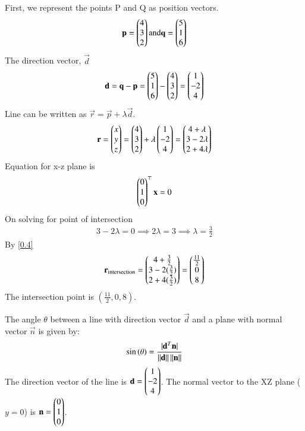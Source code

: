 \documentclass[journal]{IEEEtran}
\begin{document}
	First, we represent the points P and Q as position vectors.
	\begin{align}
		\mathbf{p} = \begin{pmatrix}4 \\ 3 \\ 2\end{pmatrix}  \text{and}  \mathbf{q} = \begin{pmatrix}5 \\ 1 \\ 6\end{pmatrix}
	\end{align}
	The direction vector, $\vec{d}$
	\begin{align}
		\mathbf{d} = \mathbf{q} - \mathbf{p} = \begin{pmatrix}5 \\ 1 \\ 6\end{pmatrix} - \begin{pmatrix}4 \\ 3 \\ 2\end{pmatrix} = \begin{pmatrix}1 \\ -2 \\ 4\end{pmatrix}
	\end{align}
	Line can be written as $\vec{r} = \vec{p} + \lambda \vec{d}$.
	\begin{align}
		\mathbf{r} = \begin{pmatrix}x \\ y \\ z\end{pmatrix} = \begin{pmatrix}4 \\ 3 \\ 2\end{pmatrix} + \lambda \begin{pmatrix}1 \\ -2 \\ 4\end{pmatrix} = \begin{pmatrix}4 + \lambda \\ 3 - 2\lambda \\ 2 + 4\lambda\end{pmatrix}
	\end{align}
	Equation for x-z plane is
	\begin{align}
		\begin{myvec}{0\\1\\0}\end{myvec}^\top\vec{x}=0
	\end{align}
	On solving for point of intersection
	\begin{align}
		3 - 2\lambda = 0 \implies 2\lambda = 3 \implies \lambda = \frac{3}{2} \label{0.4}
	\end{align}
	By \eqref{0.4}
	\begin{align}
		\mathbf{r}_{\text{intersection}} = \begin{pmatrix}4 + \frac{3}{2} \\ 3 - 2(\frac{3}{2}) \\ 2 + 4(\frac{3}{2})\end{pmatrix} = \begin{pmatrix}\frac{11}{2} \\ 0 \\ 8\end{pmatrix}
	\end{align}
	The intersection point is $(\frac{11}{2}, 0, 8)$.
	
	The angle $\theta$ between a line with direction vector $\vec{d}$ and a plane with normal vector $\vec{n}$ is given by:
	\begin{align}
		\sin\left(\theta\right)= \frac{|\mathbf{d}^T\mathbf{n}|}{\left\lVert\mathbf{d}\right\rVert \left\lVert\mathbf{n}\right\rVert} \label{0.6}
	\end{align}
	The direction vector of the line is $\mathbf{d} = \begin{pmatrix}1 \\ -2 \\ 4\end{pmatrix}$. The normal vector to the XZ plane ($y=0$) is $\mathbf{n} = \begin{pmatrix}0 \\ 1 \\ 0\end{pmatrix}$.
	
\end{document}
